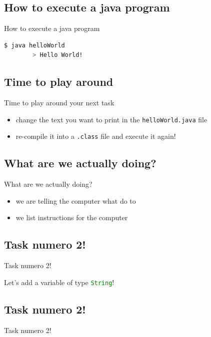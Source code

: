 \subsection{How to execute a java program}
\begin{frame}[fragile]{How to execute a java program}
	\begin{lstlisting}[language=bash]
		$ java helloWorld
		> Hello World!
	\end{lstlisting}
\end{frame}


\subsection{Time to play around}
\begin{frame}[fragile]{Time to play around}
	your next task
	\begin{itemize}[<+->]
		\item change the text you want to print in the \lstinline[columns=fixed]{helloWorld.java} file
		\item re-compile it into a \lstinline[columns=fixed]{.class} file and execute it again!
	\end{itemize}
\end{frame}


\subsection{What are we actually doing?}
\begin{frame}[fragile]{What are we actually doing?}
	\begin{itemize}[<+->]
		\item we are telling the computer what do to
		\item we list instructions for the computer
	\end{itemize}
\end{frame}


\subsection{Task numero 2!}
\begin{frame}[fragile]{Task numero 2!}
	\begin{center}
		Let's add a variable of type \lstinline[language=Java]{String}!
	\end{center}
\end{frame}

\subsection{Task numero 2!}
\begin{frame}[fragile]{Task numero 2!}
	\begin{center}
		
	\end{center}
\end{frame}


